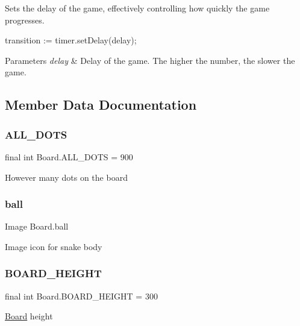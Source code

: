 Sets the delay of the game, effectively controlling how quickly the game progresses.

transition \+:= timer.\+set\+Delay(delay);


\begin{DoxyParams}{Parameters}
{\em delay} & Delay of the game. The higher the number, the slower the game. \\
\hline
\end{DoxyParams}


\subsection{Member Data Documentation}
\mbox{\label{class_board_afc3dba6349ee431f748fdcaee99b78b7}} 
\subsubsection{\texorpdfstring{A\+L\+L\+\_\+\+D\+O\+TS}{ALL\_DOTS}}
{\footnotesize\ttfamily final int Board.\+A\+L\+L\+\_\+\+D\+O\+TS = 900}

However many dots on the board \mbox{\label{class_board_a3d149787c3692d5d5ff0e14f31c4cf9a}} 
\subsubsection{\texorpdfstring{ball}{ball}}
{\footnotesize\ttfamily Image Board.\+ball}

Image icon for snake body \mbox{\label{class_board_a17a48c777b0c08986dd2db8837b1199d}} 
\subsubsection{\texorpdfstring{B\+O\+A\+R\+D\+\_\+\+H\+E\+I\+G\+HT}{BOARD\_HEIGHT}}
{\footnotesize\ttfamily final int Board.\+B\+O\+A\+R\+D\+\_\+\+H\+E\+I\+G\+HT = 300}

\hyperlink{class_board}{Board} height \mbox{\label{class_board_a26390bed1bf2786b56e6ce5c8bdfe384}} 
